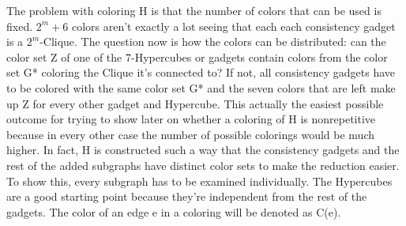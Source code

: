 \documentclass[12pt,a4paper]{article}
\begin{document}
The problem with coloring H is that the number of colors that can be used is fixed. $2^m+6$ colors aren't exactly a lot seeing that each each consistency gadget is a $2^m$-Clique. The question now is how the colors can be distributed: can the color set Z of one of the 7-Hypercubes or gadgets contain colors from the color set G* coloring the Clique it's connected to? If not, all consistency gadgets have to be colored with the same color set G* and the seven colors that are left make up Z for every other gadget and Hypercube. This actually the easiest possible outcome for trying to show later on whether a coloring of H is nonrepetitive because in every other case the number of possible colorings would be much higher. In fact, H is constructed such a way that the consistency gadgets and the rest of the added subgraphs have distinct color sets to make the reduction easier. To show this, every subgraph has to be examined individually. The Hypercubes are a good starting point because they're independent from the rest of the gadgets. The color of an edge e in a coloring will be denoted as C(e). 
\newline
\end{document}
